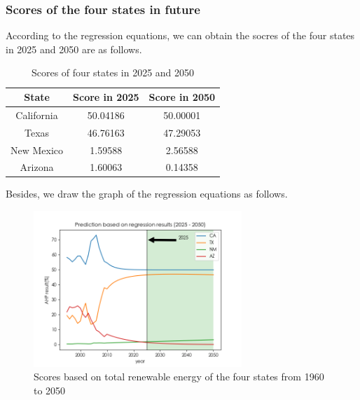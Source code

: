 \documentclass[a4paper,11pt]{article}
\begin{document}
\subsubsection{Scores of the four states in future}
\par According to the regression equations, we can obtain the socres of the four states in 2025 and 2050 are as follows.
\begin{table}[!hbp]
    \centering 
    \begin{tabular}{|c|c|c|}
\hline
State & Score in 2025 & Score in 2050 \\
\hline
California & 50.04186 & 50.00001 \\
\hline
Texas & 46.76163 & 47.29053 \\
\hline
New Mexico & 1.59588 & 2.56588 \\
\hline
Arizona & 1.60063 & 0.14358 \\
\hline
\end{tabular}
\caption{Scores of four states in 2025 and 2050}
\end{table}
\par Besides, we draw the graph of the regression equations as follows.
\begin{figure}[h]%
    \centering 
    \includegraphics[width=0.7\textwidth]{./Pic/D-scores.png}
    \caption{Scores based on total renewable energy of the four states from 1960 to 2050}
    \label{fig:D-scores}  
\end{figure}
\end{document}
